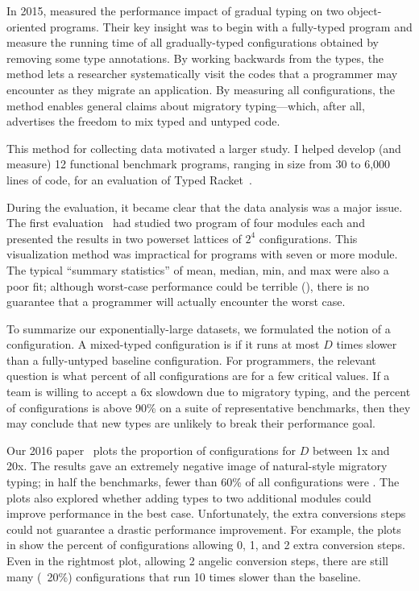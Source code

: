 In 2015, \citet{tfdfftf-ecoop-2015} measured the performance impact of gradual typing on
 two object-oriented programs.
Their key insight was to begin with a fully-typed program and measure the
 running time of all gradually-typed configurations obtained by removing
 some type annotations.
By working backwards from the types, the method lets a researcher systematically
 visit the codes that a programmer may encounter as they migrate an
 application.
By measuring all configurations, the method enables general claims about
 migratory typing---which, after all, advertises the freedom to mix typed
 and untyped code.

This method for collecting data motivated a larger study.
I helped develop (and measure) 12 functional benchmark programs, ranging in
 size from 30 to 6,000 lines of code, for an evaluation of Typed
 Racket~\cite{tfgnvf-popl-2016}.

During the evaluation, it became clear that the data analysis was a major
 issue.
The first evaluation~\cite{tfdfftf-ecoop-2015} had studied two program of four modules each
 and presented the results in two powerset lattices of $2^4$ configurations.
This visualization method was impractical for programs with seven or more
 module.
The typical ``summary statistics'' of mean, median, min, and max were also a
 poor fit; although worst-case performance could be terrible
 (), there is no guarantee that a programmer
 will actually encounter the worst case.

To summarize our exponentially-large datasets, we formulated the notion
 of a  configuration.
A mixed-typed configuration is  if it runs at most $D$ times
 slower than a fully-untyped baseline configuration.
For programmers, the relevant question is what percent of all configurations
 are  for a few critical values.
If a team is willing to accept a 6x slowdown due to migratory typing,
 and the percent of  configurations is above 90\% on a suite
 of representative benchmarks, then they may conclude that new types are
 unlikely to break their performance goal.

Our 2016 paper~\cite{tfgnvf-popl-2016} plots the proportion of
  configurations for $D$ between 1x and 20x.
The results gave an extremely negative image of natural-style migratory typing;
 in half the benchmarks, fewer than 60\% of all configurations were
 .
The plots also explored whether adding types to two additional modules could
 improve performance in the best case.
Unfortunately, the extra conversions steps could not guarantee a drastic
 performance improvement.
For example, the plots in  show the percent of
  configurations allowing 0, 1, and 2 extra conversion steps.
Even in the rightmost plot, allowing 2 angelic conversion steps, there are
 still many (~20\%) configurations that run 10 times slower than the baseline.

